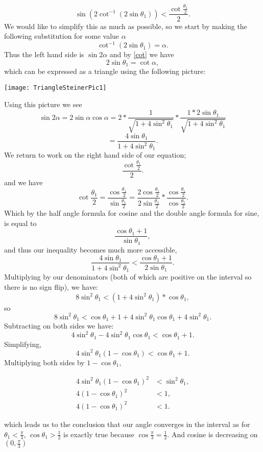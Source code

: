 \documentclass[12pt]{report}
\numberwithin{definition}{section}
\begin{document}
\[
 \sin{ (2\cot^{-1}{(2\sin{\theta_1})})} < \frac{  \cot{ \frac{\theta_1} {2}}   }  {2}.
\]
We would like to simplify this as much as possible, so we start by making the following substitution for some value $\alpha$ 
\begin{equation}\label{cot}
\cot^{-1}{(2\sin{\theta_1})} = \alpha .
\end{equation}
 Thus the left hand side is $\sin{2\alpha}$ and by \eqref{cot} we have   
\[
2\sin{\theta_1} = \cot{\alpha},
\]
which can be expressed as a triangle using the following picture:

\texttt{[image: TriangleSteinerPic1]}


Using this picture we see
\[
\sin{2\alpha} = 2\sin{\alpha}\cos{\alpha} = 2*\frac{1}{\sqrt{1+4\sin^2{\theta_1}}}*\frac{1*2\sin{\theta_1}}{\sqrt{1+4\sin^2{\theta_1}}}
\]
\[
 = \frac{4\sin{\theta_1}}{1+4\sin^2{\theta_1}}.
\]
We return to work on the right hand side of our equation;
\[
 \frac{  \cot{ \frac{\theta_1} {2}}   }  {2}.
\]
and we have 
\[
 \cot{ \frac{\theta_1} {2}} = \frac{\cos{ \frac{\theta_1} {2}}} {\sin{ \frac{\theta_1} {2}}} =  \frac{2\cos{ \frac{\theta_1} {2}}} {2\sin{ \frac{\theta_1} {2}}}*\frac{\cos{ \frac{\theta_1} {2}}}{\cos{ \frac{\theta_1} {2}}}.
\]
Which by the half angle formula for cosine and the double angle formula for sine, is equal to 
\[
\frac{\cos{\theta_1+1}}{\sin{\theta_1}},
\]
and thus our inequality becomes much more accessible, 
\[
\frac{4\sin{\theta_1}}{1+4\sin^2{\theta_1}} < \frac{\cos{\theta_1}+1}{2\sin{\theta_1}}.
\]
Multiplying by our denominators (both of which are positive on the interval so there is no sign flip), we have:
\[
8\sin^2{\theta_1} < (1+4\sin^2{\theta_1})*\cos{\theta_1},
\]
so
\[
8\sin^2{\theta_1} < \cos{\theta_1}+1+4\sin^2{\theta_1}\cos{\theta_1}+4\sin^2{\theta_1}.
\]
Subtracting on both sides we have:
\[
4\sin^2{\theta_1}-4\sin^2{\theta_1}\cos{\theta_1} < \cos{\theta_1}+1.
\]
Simplifying,
\[
4\sin^2{\theta_1}(1-\cos{\theta_1})<\cos{\theta_1}+1.
\]
Multiplying both sides by $1-\cos{\theta_1}$,

\begin{align*}
 4\sin^2{\theta_1}(1-\cos{\theta_1})^2 &< \sin^2{\theta_1},\\
4(1-\cos{\theta_1})^2&<1,\\
4(1-\cos{\theta_1})^2&<1.
\end{align*}


which leads us to the conclusion that our angle converges in the interval as for  $\theta_1 < \frac{\pi}{3}$, $\cos{\theta_1} > \frac{1}{2}$ is exactly true because $\cos{\frac{\pi}{3}} = \frac{1}{2}$. And cosine is decreasing on $(0, \frac{\pi}{3})$ 
\end{document}
